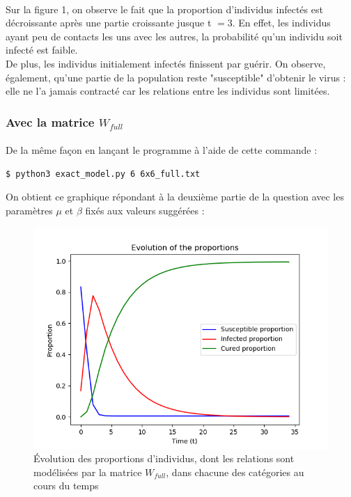 \documentclass[a4paper, 12pt, oneside]{article}
\begin{document}
\paragraph{}Sur la figure 1, on observe le fait que la proportion d'individus infectés est décroissante après une partie croissante jusque t $= 3$. En effet, les individus ayant peu de contacts les uns avec les autres, la probabilité qu'un individu soit infecté est faible.\\
De plus, les individus initialement infectés finissent par guérir. On observe, également, qu'une partie de la population reste "susceptible" d'obtenir le virus : elle ne l'a jamais contracté car les relations entre les individus sont limitées.

\subsubsection{Avec la matrice $W_{full}$}

\paragraph{}De la même façon en lançant le programme à l'aide de cette commande :
\begin{lstlisting}[language=bash]
$ python3 exact_model.py 6 6x6_full.txt
\end{lstlisting}

\noindent On obtient ce graphique répondant à la deuxième partie de la question avec les paramètres $\mu$ et $\beta$ fixés aux valeurs suggérées : 

\begin{figure}[H]
	\centering
	\includegraphics[scale=1]{full_6x6.png} 
	\caption{Évolution des proportions d'individus, dont les relations sont modélisées par la matrice $W_{full}$, dans chacune des catégories au cours du temps}
\end{figure}
\end{document}
